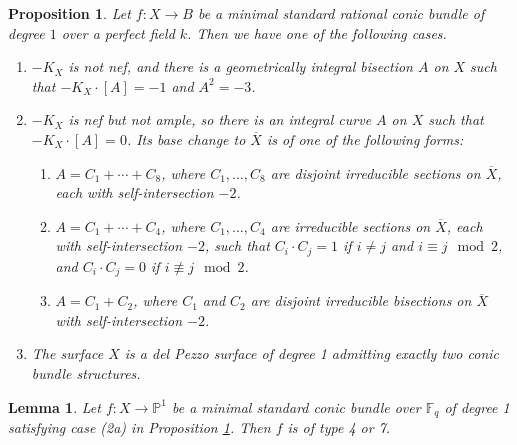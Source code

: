 \documentclass[10pt,a4paper]{amsart}
\newtheorem{lemma}{Lemma}
\newtheorem{proposition}{Proposition}
\def \F {{\mathbb F}}
\def \P {{\mathbb P}}
\newcommand{\ra}{\rightarrow}
\begin{document}
\begin{proposition}\label{prop:classificationCB}
    Let $f \colon X \ra B$ be a minimal standard rational conic bundle of degree $1$ over a perfect field $k$. Then we have one of the following cases.
    \begin{enumerate}
        \item $-K_X$ is not nef, and there is a geometrically integral bisection $A$ on $X$ such that $-K_X \cdot [A] = -1$ and $A^2 = -3$.
        \item $-K_X$ is nef but not ample, so there is an integral curve $A$ on $X$ such that $-K_X \cdot [A] = 0$. Its base change to $\overline{X}$ is of one of the following forms:
        \begin{enumerate}
            \item $A = C_1 + \cdots + C_8$, where $C_1, \ldots, C_8$ are disjoint irreducible sections on $\overline{X}$, each with self-intersection $-2$.
        
            \item $A = C_1 + \cdots + C_4$, where $C_1, \ldots, C_4$ are irreducible sections on $\overline{X}$, each with self-intersection $-2$, such that $C_i \cdot C_j = 1$ if $i \neq j$ and $i \equiv j \mod 2$, and $C_i \cdot C_j = 0$ if $i \not \equiv j \mod 2$.

            \item $A = C_1 + C_2$, where $C_1$ and $C_2$ are disjoint irreducible bisections on $\overline{X}$ with self-intersection $-2$.
        \end{enumerate}
         \item The surface $X$ is a del Pezzo surface of degree 1 admitting exactly two conic bundle structures.
    \end{enumerate}
\end{proposition}

\begin{lemma}\label{lem:type4type7}
    Let $f \colon X \ra \P^1 $ be a minimal standard conic bundle over $\F_q$ of degree 1 satisfying case (2a) in Proposition \ref{prop:classificationCB}. Then $f$ is of type 4 or 7.
\end{lemma}
\end{document}
